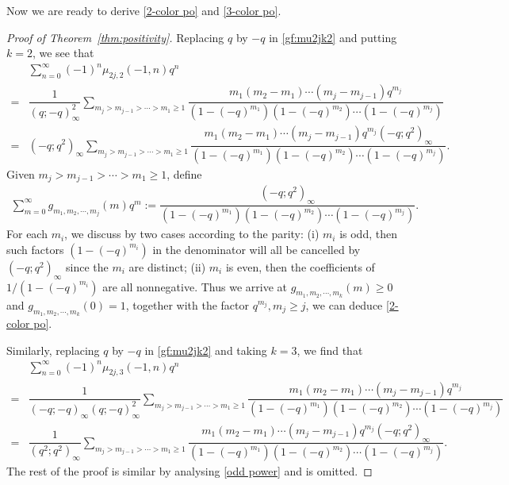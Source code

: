 \documentclass[12pt]{amsart}
\numberwithin{equation}{section}
\theoremstyle{plain}
\theoremstyle{definition}
\begin{document}
Now we are ready to derive \eqref{2-color po} and \eqref{3-color po}.
\begin{proof}[Proof of Theorem~\ref{thm:positivity}]
Replacing $q$ by $-q$ in \eqref{gf:mu2jk2} and putting $k=2$, we see that
\begin{align*}
 &\sum_{n=0}^{\infty}(-1)^{n}\mu_{2j,2}(-1,n)q^{n}\\
 =&\dfrac{1}{(q;-q)_{\infty}^{2}}\sum_{m_{j}> m_{j-1}>\cdots>m_{1}\geq1}\dfrac{m_{1}(m_{2}-m_{1})\cdots(m_{j}-m_{j-1})q^{m_{j}}}{(1-(-q)^{m_{1}})(1-(-q)^{m_{2}})\cdots(1-(-q)^{m_{j}})}\\
 =&(-q;q^{2})_{\infty}\sum_{m_{j}> m_{j-1}>\cdots>m_{1}\geq1}\dfrac{m_{1}(m_{2}-m_{1})\cdots(m_{j}-m_{j-1})q^{m_{j}}(-q;q^{2})_{\infty}}{(1-(-q)^{m_{1}})(1-(-q)^{m_{2}})
 \cdots(1-(-q)^{m_{j}})}.
\end{align*}
Given $m_{j}> m_{j-1}>\cdots>m_{1}\geq1$, define
\begin{align}\label{odd power}
\sum_{m=0}^{\infty}g_{m_{1},m_{2},\cdots,m_{j}}(m)q^{m}:=\dfrac{(-q;q^{2})_{\infty}}{(1-(-q)^{m_{1}})(1-(-q)^{m_{2}})\cdots(1-(-q)^{m_{j}})}.
\end{align}
For each $m_{i}$, we discuss by two cases according to the parity: (i) $m_{i}$ is odd, then such factors $(1-(-q)^{m_{i}})$ in the denominator will all be cancelled by $(-q;q^{2})_{\infty}$ since the $m_{i}$ are distinct; (ii) $m_{i}$ is even, then the coefficients of $1/(1-(-q)^{m_{i}})$ are all nonnegative. Thus we arrive at $g_{m_{1},m_{2},\cdots,m_{k}}(m)\geq 0$ and $g_{m_{1},m_{2},\cdots,m_{k}}(0)=1$, together with the factor $q^{m_j}, m_j\geq j$, we can deduce \eqref{2-color po}.

Similarly, replacing $q$ by $-q$ in \eqref{gf:mu2jk2} and taking $k=3$, we find that
\begin{align*}
 &\sum_{n=0}^{\infty}(-1)^{n}\mu_{2j,3}(-1,n)q^{n}\\
 =&\dfrac{1}{(-q;-q)_{\infty}(q;-q)_{\infty}^{2}}\sum_{m_{j}> m_{j-1}>\cdots>m_{1}\geq1}\dfrac{m_{1}(m_{2}-m_{1})\cdots(m_{j}-m_{j-1})q^{m_{j}}}{(1-(-q)^{m_{1}})(1-(-q)^{m_{2}})\cdots(1-(-q)^{m_{j}})}\\
 =&\dfrac{1}{(q^{2};q^{2})_{\infty}}\sum_{m_{j}> m_{j-1}>\cdots>m_{1}\geq1}\dfrac{m_{1}(m_{2}-m_{1})\cdots(m_{j}-m_{j-1})q^{m_{j}}(-q;q^{2})_{\infty}}{(1-(-q)^{m_{1}})(1-(-q)^{m_{2}})\cdots(1-(-q)^{m_{j}})}.
\end{align*}
The rest of the proof is similar by analysing \eqref{odd power} and is omitted.
\end{proof}
\end{document}
